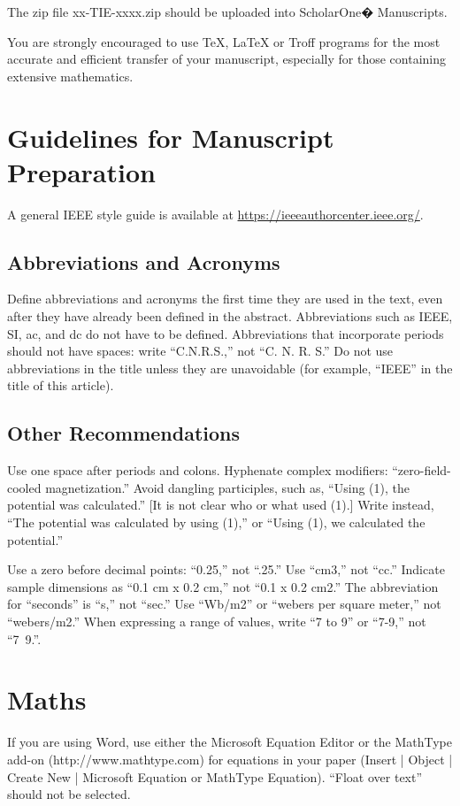 \documentclass[journal]{IEEEtranTIE}
\begin{document}
The zip file xx-TIE-xxxx.zip should be uploaded into ScholarOne� Manuscripts.

You are strongly encouraged to use TeX, LaTeX or Troff programs for the most accurate and efficient transfer of your manuscript, especially for those containing extensive mathematics.


\section{Guidelines for Manuscript Preparation}
A general IEEE style guide is available at \url{https://ieeeauthorcenter.ieee.org/}.

\subsection{Abbreviations and Acronyms}
Define abbreviations and acronyms the first time they are used in the text, even after they have already been defined in the abstract. Abbreviations such as IEEE, SI, ac, and dc do not have to be defined. Abbreviations that incorporate periods should not have spaces: write ``C.N.R.S.,'' not ``C. N. R. S.'' Do not use abbreviations in the title unless they are unavoidable (for example, ``IEEE'' in the title of this article).	

\subsection{Other Recommendations}
Use one space after periods and colons. Hyphenate complex modifiers: ``zero-field-cooled magnetization.'' Avoid dangling participles, such as, ``Using (1), the potential was calculated.'' [It is not clear who or what used (1).] Write instead, ``The potential was calculated by using (1),'' or ``Using (1), we calculated the potential.''

Use a zero before decimal points: ``0.25,'' not ``.25.'' Use ``cm3,'' not ``cc.'' Indicate sample dimensions as ``0.1 cm x 0.2 cm,'' not ``0.1 x 0.2 cm2.'' The abbreviation for ``seconds'' is ``s,'' not ``sec.'' Use ``Wb/m2'' or ``webers per square meter,'' not ``webers/m2.'' When expressing a range of values, write ``7 to 9'' or ``7-9,'' not ``7~9.''.

\section{Maths}

If you are using Word, use either the Microsoft Equation Editor or the MathType add-on (http://www.mathtype.com) for equations in your paper (Insert | Object | Create New | Microsoft Equation or MathType Equation). ``Float over text'' should not be selected.
\end{document}
